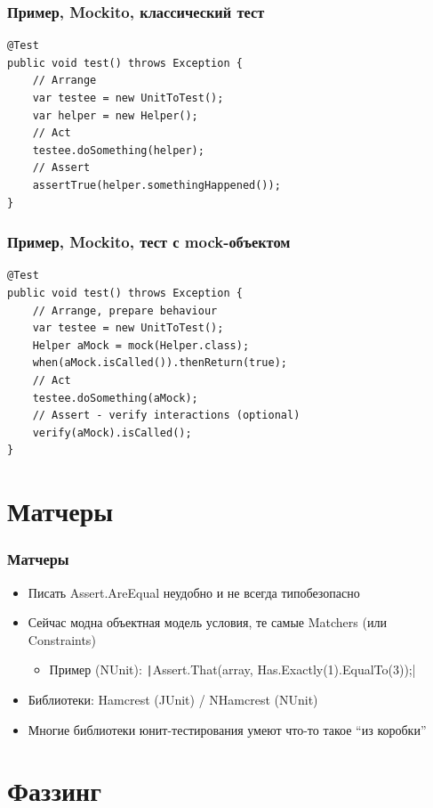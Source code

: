 \documentclass{../../slides-style}
\begin{document}
    \begin{frame}[fragile]
        \frametitle{Пример, Mockito, классический тест}
        \begin{verbatim}
@Test 
public void test() throws Exception {
    // Arrange
    var testee = new UnitToTest();
    var helper = new Helper();
    // Act
    testee.doSomething(helper);
    // Assert
    assertTrue(helper.somethingHappened());
}
        \end{verbatim}
    \end{frame}

    \begin{frame}[fragile]
        \frametitle{Пример, Mockito, тест с mock-объектом}
        \begin{verbatim}
@Test
public void test() throws Exception {
    // Arrange, prepare behaviour
    var testee = new UnitToTest();
    Helper aMock = mock(Helper.class);
    when(aMock.isCalled()).thenReturn(true);
    // Act
    testee.doSomething(aMock);
    // Assert - verify interactions (optional)
    verify(aMock).isCalled();
}
        \end{verbatim}
    \end{frame}

    \section{Матчеры}

    \begin{frame}
        \frametitle{Матчеры}
        \begin{itemize}
            \item Писать Assert.AreEqual неудобно и не всегда типобезопасно
            \item Сейчас модна объектная модель условия, те самые Matchers (или Constraints)
            \begin{itemize}
                \item Пример (NUnit): \texttt|Assert.That(array, Has.Exactly(1).EqualTo(3));|
            \end{itemize}
            \item Библиотеки: Hamcrest (JUnit) / NHamcrest (NUnit)
            \item Многие библиотеки юнит-тестирования умеют что-то такое ``из коробки''
        \end{itemize}
    \end{frame}

    \section{Фаззинг}
\end{document}
